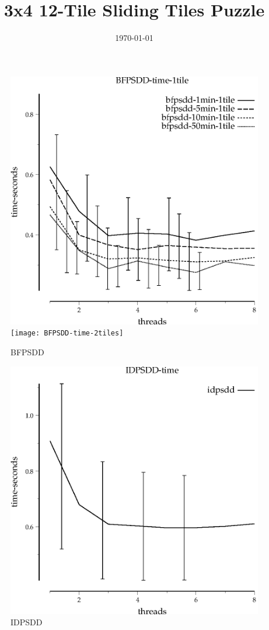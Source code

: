 \documentclass{article}
\title{3x4 12-Tile Sliding Tiles Puzzle}
\date{\today}
\begin{document}
\maketitle

\begin{figure}
\begin{center}
\includegraphics{BFPSDD-time-1tile}
\texttt{[image: BFPSDD-time-2tiles]}
\end{center}
\caption{BFPSDD}
\end{figure}

\begin{figure}
\begin{center}
\includegraphics{IDPSDD-time}
\end{center}
\caption{IDPSDD}
\end{figure}
\end{document}
